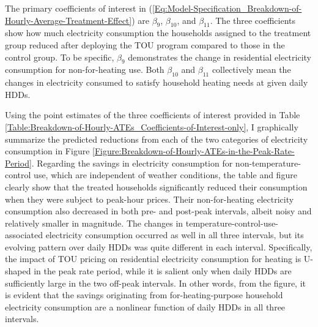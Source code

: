 The primary coefficients of interest in (\ref{Eq:Model-Specification_Breakdown-of-Hourly-Average-Treatment-Effect}) are $\beta_{9}$, $\beta_{10}$, and $\beta_{11}$. The three coefficients show how much electricity consumption the households assigned to the treatment group reduced after deploying the TOU program compared to those in the control group. To be specific, $\beta_{9}$ demonstrates the change in residential electricity consumption for non-for-heating use. Both $\beta_{10}$ and $\beta_{11}$ collectively mean the changes in electricity consumed to satisfy household heating needs at given daily HDDs. 

Using the point estimates of the three coefficients of interest provided in Table \ref{Table:Breakdown-of-Hourly-ATEs_Coefficients-of-Interest-only}, I graphically summarize the predicted reductions from each of the two categories of electricity consumption in Figure \ref{Figure:Breakdown-of-Hourly-ATEs-in-the-Peak-Rate-Period}. Regarding the savings in electricity consumption for non-temperature-control use, which are independent of weather conditions, the table and figure clearly show that the treated households significantly reduced their consumption when they were subject to peak-hour prices. Their non-for-heating electricity consumption also decreased in both pre- and post-peak intervals, albeit noisy and relatively smaller in magnitude. The changes in temperature-control-use-associated electricity consumption occurred as well in all three intervals, but its evolving pattern over daily HDDs was quite different in each interval. Specifically, the impact of TOU pricing on residential electricity consumption for heating is U-shaped in the peak rate period, while it is salient only when daily HDDs are sufficiently large in the two off-peak intervals. In other words, from the figure, it is evident that the savings originating from for-heating-purpose household electricity consumption are a nonlinear function of daily HDDs in all three intervals.

